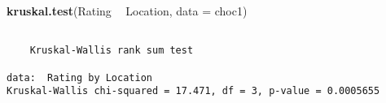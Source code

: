 \documentclass[]{article}
\newenvironment{Shaded}{\begin{snugshade}}{\end{snugshade}}
\newcommand{\DataTypeTok}[1]{\textcolor[rgb]{0.13,0.29,0.53}{#1}}
\newcommand{\KeywordTok}[1]{\textcolor[rgb]{0.13,0.29,0.53}{\textbf{#1}}}
\newcommand{\NormalTok}[1]{#1}
\newcommand{\OperatorTok}[1]{\textcolor[rgb]{0.81,0.36,0.00}{\textbf{#1}}}
\newcommand{\StringTok}[1]{\textcolor[rgb]{0.31,0.60,0.02}{#1}}
\begin{document}
\begin{Shaded}
\begin{Highlighting}[]
\KeywordTok{kruskal.test}\NormalTok{(Rating }\OperatorTok{~}\StringTok{ }\NormalTok{Location, }\DataTypeTok{data =}\NormalTok{ choc1)}
\end{Highlighting}
\end{Shaded}

\begin{verbatim}

    Kruskal-Wallis rank sum test

data:  Rating by Location
Kruskal-Wallis chi-squared = 17.471, df = 3, p-value = 0.0005655
\end{verbatim}
\end{document}
